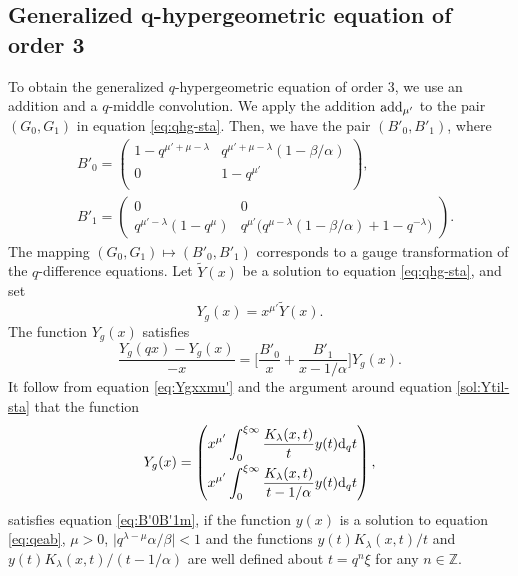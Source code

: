 \documentclass[pdftex]{sigma}
\numberwithin{equation}{section}
\theoremstyle{definition}
\begin{document}
\subsection[Generalized q-hypergeometric equation of order 3]{Generalized $\boldsymbol{q}$-hypergeometric equation of order 3} \label{sec:qmcex}

To obtain the generalized $q$-hypergeometric equation of order $3$, we use an addition and a $q$-middle convolution.
We apply the addition ${\rm add}_{\mu' } $ to the pair $(G_0, G_1) $ in equation \eqref{eq:qhg-sta}.
Then, we have the pair $(B'_0 , B'_1 )$, where
\begin{align*}
& B'_0 = \begin{pmatrix}
 1 -q^{\mu' + \mu -\lambda } & q^{\mu' + \mu -\lambda }(1-\beta/\alpha) \\
 0 & 1 - q^{\mu' } \\
 \end{pmatrix}, \\
& B'_1 = \begin{pmatrix}
 0 & 0\\
 q^{\mu' -\lambda } ( 1 -q^{\mu } ) & q^{\mu' } \bigl( q^{\mu -\lambda }(1-\beta/\alpha)+ 1 - q^{-\lambda} \bigr)
\end{pmatrix}.
\end{align*}
The mapping $(G_0, G_1) \mapsto (B'_0 , B'_1 ) $ corresponds to a gauge transformation of the $q$-difference equations.
Let $\widetilde{Y}(x)$ be a solution to equation \eqref{eq:qhg-sta}, and set
\begin{equation} \label{eq:Ygxxmu'}
 Y_g(x) = x^{\mu'}\widetilde{Y}(x).
\end{equation}
The function $ Y_g(x) $ satisfies
\begin{equation} \label{eq:B'0B'1m}
\frac{Y_g(qx) - Y_g(x)}{-x} = \bigg[ \frac{B'_0}{x} + \frac{B'_1}{x-1/\alpha} \bigg] Y_g(x).
\end{equation}
It follow from equation \eqref{eq:Ygxxmu'} and the argument around equation \eqref{sol:Ytil-sta} that the function
 \begin{equation*}
Y_g(x) =
\begin{pmatrix}
 \displaystyle x^{\mu'} \int_0^{\xi \infty} \frac{K_{\lambda}(x,t)}{t} y(t) {\rm d}_q t \vspace{1mm}\\
 \displaystyle x^{\mu'} \int_0^{\xi \infty} \frac{K_{\lambda}(x,t)}{t-1/\alpha} y(t) {\rm d}_q t
\end{pmatrix},
\end{equation*}
satisfies equation \eqref{eq:B'0B'1m}, if the function $y(x)$ is a solution to equation \eqref{eq:qeab}, $ \mu >0$, $ \big|q^{\lambda - \mu} \alpha / \beta \big|<1 $ and the functions $y(t) K_{\lambda}(x,t)/ t $ and $ y(t) K_{\lambda}(x,t)/(t-1/\alpha ) $ are well defined about $t = q^n \xi $ for any $n \in \mathbb{Z} $.
\end{document}

